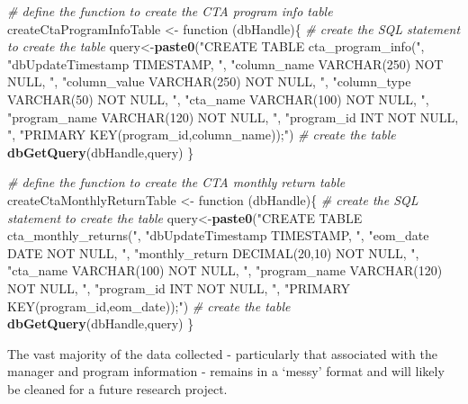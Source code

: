 \documentclass[]{article}
\newenvironment{Shaded}{\begin{snugshade}}{\end{snugshade}}
\newcommand{\KeywordTok}[1]{\textcolor[rgb]{0.13,0.29,0.53}{\textbf{{#1}}}}
\newcommand{\StringTok}[1]{\textcolor[rgb]{0.31,0.60,0.02}{{#1}}}
\newcommand{\CommentTok}[1]{\textcolor[rgb]{0.56,0.35,0.01}{\textit{{#1}}}}
\newcommand{\NormalTok}[1]{{#1}}
\begin{document}
\begin{Shaded}
\begin{Highlighting}[]
\CommentTok{# define the function to create the CTA program info table}
\NormalTok{createCtaProgramInfoTable <-}\StringTok{ }\NormalTok{function (dbHandle)\{}
  \CommentTok{# create the SQL statement to create the table}
  \NormalTok{query<-}\KeywordTok{paste0}\NormalTok{(}\StringTok{"CREATE TABLE cta_program_info("}\NormalTok{,}
                \StringTok{"dbUpdateTimestamp TIMESTAMP, "}\NormalTok{,}
                \StringTok{"column_name VARCHAR(250) NOT NULL, "}\NormalTok{,}
                \StringTok{"column_value VARCHAR(250) NOT NULL, "}\NormalTok{,}
                \StringTok{"column_type VARCHAR(50) NOT NULL, "}\NormalTok{,}
                \StringTok{"cta_name VARCHAR(100) NOT NULL, "}\NormalTok{,}
                \StringTok{"program_name VARCHAR(120) NOT NULL, "}\NormalTok{,}
                \StringTok{"program_id INT NOT NULL, "}\NormalTok{,}
                \StringTok{"PRIMARY KEY(program_id,column_name));"}\NormalTok{)}
  \CommentTok{# create the table}
  \KeywordTok{dbGetQuery}\NormalTok{(dbHandle,query)}
\NormalTok{\}}

\CommentTok{# define the function to create the CTA monthly return table}
\NormalTok{createCtaMonthlyReturnTable <-}\StringTok{ }\NormalTok{function (dbHandle)\{}
  \CommentTok{# create the SQL statement to create the table}
  \NormalTok{query<-}\KeywordTok{paste0}\NormalTok{(}\StringTok{"CREATE TABLE cta_monthly_returns("}\NormalTok{,}
                \StringTok{"dbUpdateTimestamp TIMESTAMP, "}\NormalTok{,}
                \StringTok{"eom_date DATE NOT NULL, "}\NormalTok{,}
                \StringTok{"monthly_return DECIMAL(20,10) NOT NULL, "}\NormalTok{,}
                \StringTok{"cta_name VARCHAR(100) NOT NULL, "}\NormalTok{,}
                \StringTok{"program_name VARCHAR(120) NOT NULL, "}\NormalTok{,}
                \StringTok{"program_id INT NOT NULL, "}\NormalTok{,}
                \StringTok{"PRIMARY KEY(program_id,eom_date));"}\NormalTok{)}
  \CommentTok{# create the table}
  \KeywordTok{dbGetQuery}\NormalTok{(dbHandle,query)}
\NormalTok{\}}
\end{Highlighting}
\end{Shaded}

The vast majority of the data collected - particularly that associated
with the manager and program information - remains in a `messy' format
and will likely be cleaned for a future research project.
\end{document}
